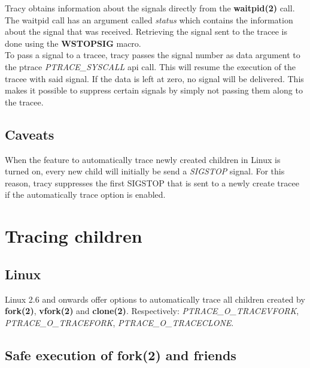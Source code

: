 \documentclass[a4paper, 10pt]{report}
\begin{document}
Tracy obtains information about the signals directly from the
\textbf{waitpid(2)} call. The waitpid call has an argument called
\textit{status} which contains the information about the signal that was
received. Retrieving the signal sent to the tracee is done using the
\textbf{WSTOPSIG} macro. \\

To pass a signal to a tracee, tracy passes the signal number as data
argument to the ptrace \textit{PTRACE\_SYSCALL} api call. This will
resume the execution of the tracee with said signal. If the data is
left at zero, no signal will be delivered. This makes it possible to
suppress certain signals by simply not passing them along to the tracee.


\subsection{Caveats}

When the feature to automatically trace newly created children in Linux
is turned on, every new child will initially be send a \textit{SIGSTOP}
signal. For this reason, tracy suppresses the first SIGSTOP that is sent
to a newly create tracee if the automatically trace option is enabled.

\section{Tracing children}


\subsection{Linux}

Linux 2.6 and onwards offer options to automatically trace all children
created by \textbf{fork(2)}, \textbf{vfork(2)} and \textbf{clone(2)}.
Respectively: \textit{PTRACE\_O\_TRACEVFORK}, \textit{PTRACE\_O\_TRACEFORK},
\textit{PTRACE\_O\_TRACECLONE}.


\subsection{Safe execution of fork(2) and friends}
\label{safe-fork}
\end{document}
